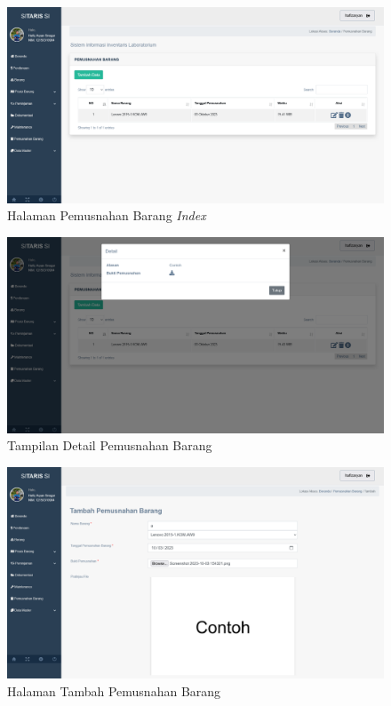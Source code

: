 \begin{enumerate}
        \begin{figure}
          \centering
          \includegraphics[width=0.82\linewidth]{konten//gambar/pemusnahan barang index.png}
          \caption{Halaman Pemusnahan Barang \textit{Index}}
          \label{fig:enter-label}
        \end{figure}

        \begin{figure}
          \centering
          \includegraphics[width=0.82\linewidth]{konten//gambar/pemusnahan barangdtl.png}
          \caption{Tampilan Detail Pemusnahan Barang}
          \label{fig:enter-label}
        \end{figure}

        \begin{figure}
          \centering
          \includegraphics[width=0.82\linewidth]{konten//gambar/pemusnahan barangtbh.png}
          \caption{Halaman Tambah Pemusnahan Barang}
          \label{fig:enter-label}
        \end{figure}


\end{enumerate}
